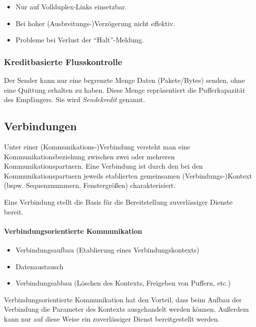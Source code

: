 \documentclass[a4paper, 14pt]{article}
\begin{document}
	\begin{itemize}
		\item Nur auf Vollduplex-Links einsetzbar.
		\item Bei hoher (Ausbreitungs-)Verzögerung nicht effektiv.
		\item Probleme bei Verlust der \enquote{Halt}-Meldung.
	\end{itemize}

	\subsubsection{Kreditbasierte Flusskontrolle}

	Der Sender kann nur eine begrenzte Menge Daten (Pakete/Bytes) senden, ohne eine Quittung erhalten zu haben.
	Diese Menge repräsentiert die Pufferkapazität des Empfängers.
	Sie wird \emph{Sendekredit} genannt.


	\subsection{Verbindungen}

	Unter einer (Kommunikations-)Verbindung versteht man eine Kommunikationsbeziehung zwischen zwei oder mehreren Kommunikationspartnern.
	Eine Verbindung ist durch den bei den Kommunikationspartnern jeweils etablierten gemeinsamen (Verbindungs-)Kontext (bspw. Sequenznummern, Fenstergrößen) charakterisiert.

	Eine Verbindung stellt die Basis für die Bereitstellung zuverlässiger Dienste bereit.

	\paragraph{Verbindungsorientierte Kommunikation}

	\begin{itemize}
		\item Verbindungsaufbau (Etablierung eines Verbindungskontexts)
		\item Datenaustausch
		\item Verbindungsabbau (Löschen des Kontexts, Freigeben von Puffern, etc.)
	\end{itemize}

	Verbindungsorientierte Kommunikation hat den Vorteil, dass beim Aufbau der Verbindung die Parameter des Kontexts ausgehandelt werden können.
	Außerdem kann nur auf diese Weise ein zuverlässiger Dienst bereitgestellt werden.
\end{document}
